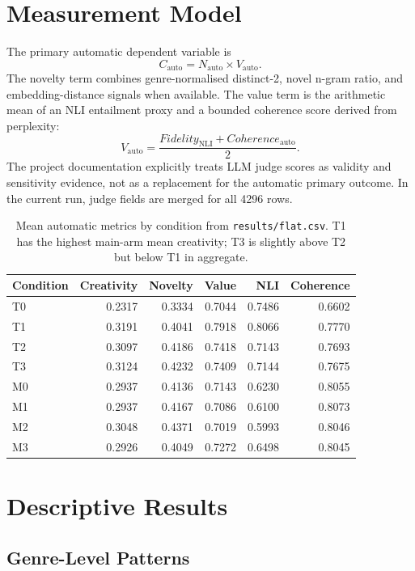 \documentclass[sigconf,nonacm]{acmart}
\begin{document}
\section{Measurement Model}

The primary automatic dependent variable is
\[
  C_{\mathrm{auto}} = N_{\mathrm{auto}} \times V_{\mathrm{auto}}.
\]
The novelty term combines genre-normalised distinct-2, novel n-gram ratio, and embedding-distance signals when available.
The value term is the arithmetic mean of an NLI entailment proxy and a bounded coherence score derived from perplexity:
\[
  V_{\mathrm{auto}} = \frac{Fidelity_{\mathrm{NLI}} + Coherence_{\mathrm{auto}}}{2}.
\]
The project documentation explicitly treats LLM judge scores as validity and sensitivity evidence, not as a replacement for the automatic primary outcome.
In the current run, judge fields are merged for all 4296 rows.

\begin{table}[t]
\centering
\small
\begin{tabular}{lrrrrr}
\toprule
Condition & Creativity & Novelty & Value & NLI & Coherence \\
\midrule
T0 & 0.2317 & 0.3334 & 0.7044 & 0.7486 & 0.6602 \\
T1 & 0.3191 & 0.4041 & 0.7918 & 0.8066 & 0.7770 \\
T2 & 0.3097 & 0.4186 & 0.7418 & 0.7143 & 0.7693 \\
T3 & 0.3124 & 0.4232 & 0.7409 & 0.7144 & 0.7675 \\
\midrule
M0 & 0.2937 & 0.4136 & 0.7143 & 0.6230 & 0.8055 \\
M1 & 0.2937 & 0.4167 & 0.7086 & 0.6100 & 0.8073 \\
M2 & 0.3048 & 0.4371 & 0.7019 & 0.5993 & 0.8046 \\
M3 & 0.2926 & 0.4049 & 0.7272 & 0.6498 & 0.8045 \\
\bottomrule
\end{tabular}
\caption{Mean automatic metrics by condition from \texttt{results/flat.csv}. T1 has the highest main-arm mean creativity; T3 is slightly above T2 but below T1 in aggregate.}
\label{tab:condition}
\end{table}

\section{Descriptive Results}

\subsection{Genre-Level Patterns}
\end{document}
